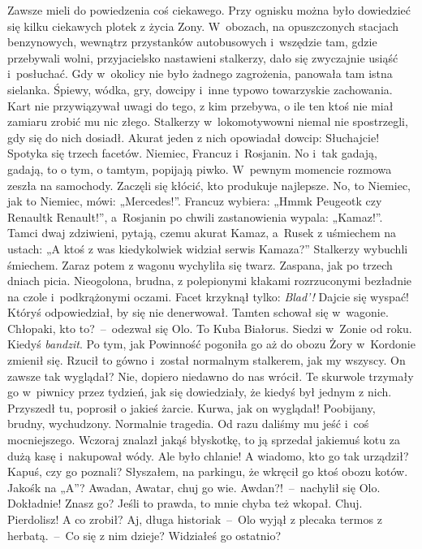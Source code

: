 \documentclass[../MAIN.tex]{subfiles}
\begin{document}
Zawsze mieli do powiedzenia coś ciekawego. Przy ognisku można było dowiedzieć się kilku ciekawych plotek z życia Zony. W~obozach, na opuszczonych stacjach benzynowych, wewnątrz przystanków autobusowych i~wszędzie tam, gdzie przebywali wolni, przyjacielsko nastawieni stalkerzy, dało się zwyczajnie usiąść i~posłuchać. Gdy w~okolicy nie było żadnego zagrożenia, panowała tam istna sielanka. Śpiewy, wódka, gry, dowcipy i~inne typowo towarzyskie zachowania. Kart nie przywiązywał uwagi do tego, z kim przebywa, o ile ten ktoś nie miał zamiaru zrobić mu nic złego. Stalkerzy w~lokomotywowni niemal nie spostrzegli, gdy się do nich dosiadł. Akurat jeden z nich opowiadał dowcip:
\sx Słuchajcie! Spotyka się trzech facetów. Niemiec, Francuz i~Rosjanin. No i~tak gadają, gadają, to o tym, o tamtym, popijają piwko. W~pewnym momencie rozmowa zeszła na samochody. Zaczęli się kłócić, kto produkuje najlepsze. No, to Niemiec, jak to Niemiec, mówi: „Mercedes!”. Francuz wybiera: „Hmm\3k Peugeot\3k czy Renault\3k Renault!”, a~Rosjanin po chwili zastanowienia wypala: „Kamaz!”. Tamci dwaj zdziwieni, pytają, czemu akurat Kamaz, a~Rusek z uśmiechem na ustach: „A ktoś z was kiedykolwiek widział serwis Kamaza?”
\qm
Stalkerzy wybuchli śmiechem. Zaraz potem z wagonu wychyliła się twarz. Zaspana, jak po trzech dniach picia. Nieogolona, brudna, z polepionymi kłakami rozrzuconymi bezładnie na czole i~podkrążonymi oczami. Facet krzyknął tylko:
\sx  \textit{Blad'!} Dajcie się wyspać!
\qm
Któryś odpowiedział, by się nie denerwował. Tamten schował się w~wagonie.
\sx Chłopaki, kto to?~--~odezwał się Olo.
\xx To Kuba Białorus. Siedzi w~Zonie od roku. Kiedyś \textit{bandzit}. Po tym, jak Powinność pogoniła go aż do obozu Żory w~Kordonie zmienił się. Rzucił to gówno i~został normalnym stalkerem, jak my wszyscy.
\xx On zawsze tak wyglądał?
\xx Nie, dopiero niedawno do nas wrócił. Te skurwole trzymały go w~piwnicy przez tydzień, jak się dowiedziały, że kiedyś był jednym z nich. Przyszedł tu, poprosił o jakieś żarcie. Kurwa, jak on wyglądał! Poobijany, brudny, wychudzony. Normalnie tragedia. Od razu daliśmy mu jeść i~coś mocniejszego. Wczoraj znalazł jakąś błyskotkę, to ją sprzedał jakiemuś kotu za dużą kasę i~nakupował wódy. Ale było chlanie!
\xx A wiadomo, kto go tak urządził? Kapuś, czy go poznali?
\xx Słyszałem, na parkingu, że wkręcił go ktoś obozu kotów. Jakoś\3k na „A”? Awadan, Awatar, chuj go wie.
\xx Awdan?!~--~nachylił się Olo.
\xx Dokładnie! Znasz go?
\xx Jeśli to prawda, to mnie chyba też wkopał. Chuj.
\xx Pierdolisz! A co zrobił?
\xx Aj, długa historia\3k~--~Olo wyjął z plecaka termos z herbatą.~--~Co się z nim dzieje? Widziałeś go ostatnio?
\end{document}
